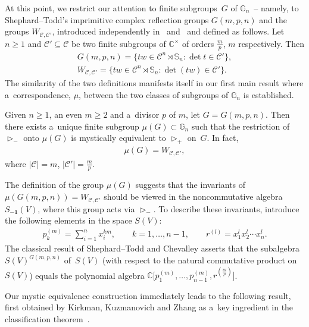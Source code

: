 At this point, we restrict our attention to f\/inite subgroups~$G$ of $\mathbb G_n$~-- namely, to Shephard--Todd's
imprimitive complex ref\/lection groups $G(m,p,n)$ and the groups $W_{{\mathcal C},{\mathcal C}'}$, introduced
independently in~\cite{BBselecta} and~\cite{KKZ} and def\/ined as follows.
Let $n\ge 1$ and ${\mathcal C}'\subseteq{\mathcal C}$ be two f\/inite subgroups of $\mathbb C^\times$ of orders $\frac
mp$, $m$ respectively.
Then
\begin{gather*}
G(m,p,n)=\{tw\in {\mathcal C}^n\rtimes \mathbb S_n: \det t\in{\mathcal C}'\},
\\
W_{{\mathcal C},{\mathcal C}'} = \{ tw\in {\mathcal C}^n\rtimes \mathbb S_n: \det(tw)\in {\mathcal C}'\}.
\end{gather*}
The similarity of the two def\/initions manifests itself in our f\/irst main result  where a~correspondence, $\mu$,
between the two classes of subgroups of $\mathbb G_n$ is established.

\begin{maintheorem}
\label{thm:main}
Given $n\ge 1$, an even $m\ge 2$ and a~divisor $p$ of $m$, let $G=G(m,p,n)$.
Then there exists a~unique finite subgroup $ \mu(G) \subset \mathbb G_n $ such that the restriction of
$\mathop{\triangleright}\nolimits_-$ onto $\mu(G)$ is mystically equivalent to $\mathop{\triangleright}\nolimits_+$ on~$G$.
In fact,
\begin{gather*}
\mu(G)=W_{\mathcal C,\mathcal C'},
\end{gather*}
where $|{\mathcal C}|=m$, $|{\mathcal C}'|=\frac mp$.
\end{maintheorem}

The def\/inition of the group $\mu(G)$ suggests that the invariants of $\mu(G(m,p,n))=W_{{\mathcal C},{\mathcal C}'}$
should be viewed in the noncommutative algebra $S_{\mathbf{-1}}(V)$, where this group acts via
$\mathop{\triangleright}\nolimits_-$.
To describe these invariants, introduce the following elements in the space $S(V)$:
\begin{gather*}
p_k^{(m)} = \sum\limits_{i=1}^n x_i^{km},
\qquad
k=1,\ldots,n-1,
\qquad
r^{(l)} = x_1^{l}x_2^{l}\cdots x_n^{l}.
\end{gather*}
The classical result of Shephard--Todd and Chevalley asserts that the subalgebra $S(V)^{G(m,p,n)}$ of~$S(V)$ (with
respect to the natural commutative product on~$S(V)$) equals
the polynomial algebra $\mathbb C\big[p_1^{(m)},\ldots,p_{n-1}^{(m)}, r^{(\frac{m}{p})}\big]$.

Our mystic equivalence construction immediately leads to the following result, f\/irst obtained by Kirkman, Kuzmanovich
and Zhang as a~key ingredient in the classif\/ication theorem~\cite[Theorem~1.1]{KKZ}.

